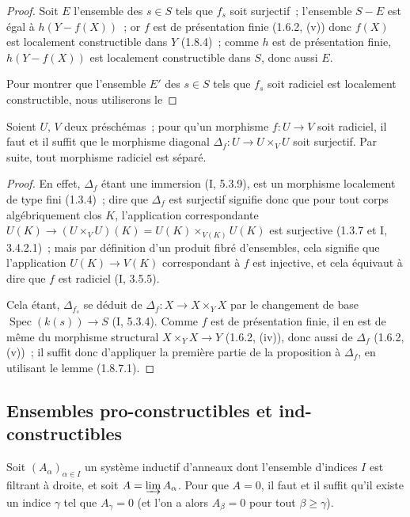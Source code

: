 \begin{proof}
Soit $E$ l'ensemble des $s\in S$ tels que $f_s$ soit surjectif~; l'ensemble
$S-E$ est égal à $h(Y-f(X))$~; or $f$ est de présentation finie (1.6.2, (v))
donc $f(X)$ est localement constructible dans $Y$ (1.8.4)~; comme $h$ est de
présentation finie, $h(Y-f(X))$ est localement constructible dans $S$, donc
aussi $E$.

Pour montrer que l'ensemble $E'$ des $s\in S$ tels que $f_s$ soit radiciel
est localement constructible, nous utiliserons le
\end{proof}

\begin{lemma}[1.8.7.1]
\label{IV.1.8.7.1-fr}
Soient $U$, $V$ deux préschémas~; pour qu'un morphisme $f:U\to V$ soit
radiciel, il faut et il suffit que le morphisme diagonal
$\Delta_f:U\to U\times_VU$ soit surjectif. Par suite, tout morphisme radiciel
est séparé.
\end{lemma}

\begin{proof}
En effet, $\Delta_f$ étant une immersion (I, 5.3.9), est un morphisme
localement de type fini (1.3.4)~; dire que $\Delta_f$ est surjectif signifie
donc que pour tout corps algébriquement clos $K$, l'application
correspondante $U(K)\to(U\times_VU)(K)=U(K)\times_{V(K)}U(K)$ est surjective
(1.3.7 et I, 3.4.2.1)~; mais par définition d'un produit fibré d'ensembles,
cela signifie que l'application $U(K)\to V(K)$ correspondant à $f$ est
injective, et cela équivaut à dire que $f$ est radiciel (I, 3.5.5).

Cela étant, $\Delta_{f_s}$ se déduit de $\Delta_f:X\to X\times_YX$ par le
changement de base $\operatorname{Spec}(k(s))\to S$ (I, 5.3.4). Comme $f$
est de présentation finie, il en est de même du morphisme structural
$X\times_YX\to Y$ (1.6.2, (iv)), donc aussi de $\Delta_f$ (1.6.2, (v))~; il
suffit donc d'appliquer la première partie de la proposition à $\Delta_f$,
en utilisant le lemme (1.8.7.1).
\end{proof}

\subsection{Ensembles pro-constructibles et ind-constructibles}
\label{subsection:IV.1.9-fr}

\begin{lemma}[1.9.1]
\label{IV.1.9.1-fr}
Soit $(A_\alpha)_{\alpha\in I}$ un système inductif d'anneaux dont l'ensemble
d'indices $I$ est filtrant à droite, et soit $A=\varinjlim A_\alpha$. Pour que
$A=0$, il faut et il suffit qu'il existe un indice $\gamma$ tel que
$A_\gamma=0$ (et l'on a alors $A_\beta=0$ pour tout $\beta\geq\gamma$).
\end{lemma}

